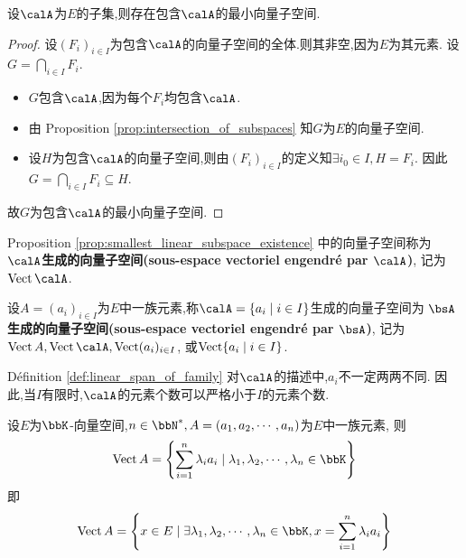 \begin{prop} \label{prop:smallest_linear_subspace_existence}
    设$\calA$为$E$的子集,则存在包含$\calA$的最小向量子空间.
\end{prop}

\begin{proof}
    设$(F_i)_{i \in I}$为包含$\calA$的向量子空间的全体.则其非空,因为$E$为其元素.
    设$G = \bigcap\limits_{i \in I} F_i$.

    \begin{itemize}
        \item $G$包含$\calA$,因为每个$F_i$均包含$\calA$.
        \item 由 Proposition \ref{prop:intersection_of_subspaces} 知$G$为$E$的向量子空间.
        \item 设$H$为包含$\calA$的向量子空间,则由$(F_i)_{i \in I}$的定义知$\exists i_0 \in I, H = F_i$.
            因此$G = \bigcap\limits_{i \in I} F_i \subseteq H$.
    \end{itemize}

    故$G$为包含$\calA$的最小向量子空间.
\end{proof}

\begin{rqq}
    Proposition \ref{prop:smallest_linear_subspace_existence} 中的向量子空间称为
    \textbf{$\boldsymbol{\calA}$生成的向量子空间(sous-espace vectoriel engendré par $\boldsymbol{\calA}$)},
    记为$\vect \calA$.
\end{rqq}

\begin{deff} \label{def:linear_span_of_family}
    设$A = (a_i)_{i \in I}$为$E$中一族元素,称$\calA = \{ a_i \mid i \in I \}$生成的向量子空间为
    \textbf{$\bsA$生成的向量子空间(sous-espace vectoriel engendré par $\bsA$)},
    记为$\vect A, \vect \calA, \vect (a_i)_{i \in I}$,
    或$\operatorname{Vect} \{ a_i \mid i \in I \}$.
\end{deff}

\begin{rqq}
    Définition \ref{def:linear_span_of_family} 对$\calA$的描述中,$a_i$不一定两两不同.
    因此,当$I$有限时,$\calA$的元素个数可以严格小于$I$的元素个数.
\end{rqq}

\begin{prop}\label{prop:description_of_linear_span}
    设$E$为$\bbK$-向量空间,$n \in \bbN^*, A = (a_1, a_2, \cdots, a_n)$为$E$中一族元素,
    则\[ \vect A = \left\{ \sum\limits_{i=1}^n \lambda_i a_i \mid \lambda_1, \lambda_2, \cdots, \lambda_n \in \bbK \right\} \]
    即\[ \vect A = \left\{ x \in E \mid \exists \lambda_1, \lambda_2, \cdots, \lambda_n \in \bbK,
    x = \sum\limits_{i = 1}^n \lambda_i a_i \right\} \]
\end{prop}

